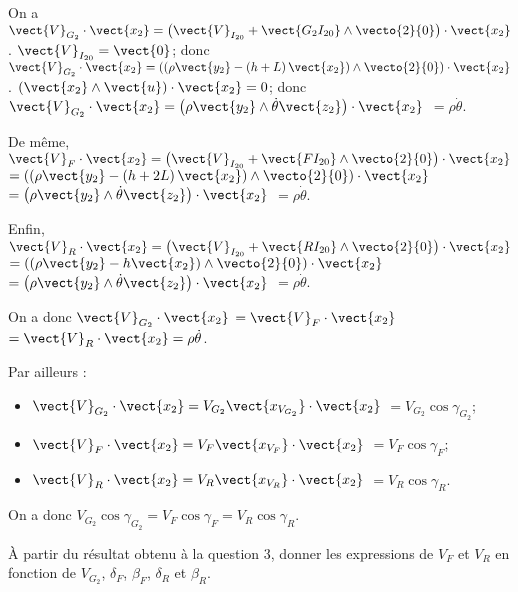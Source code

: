 \documentclass[11pt]{article}
\begin{document}
\begin{UPSTIcorrige}

On a $\vect{V}_{G_2} \cdot \vect{x_2}=\left(\vect{V}_{I_{20}}+\vect{G_2 I_{20}}\wedge \vecto{2}{0}\right)  \cdot \vect{x_2}$. $\vect{V}_{I_{20}}=\vect{0}$; donc $\vect{V}_{G_2} \cdot \vect{x_2}=\left(\left(\rho \vect{y_2} - \left(h+L\right)\vect{x_2}\right) \wedge \vecto{2}{0}\right)  \cdot \vect{x_2}$ .  $\left(\vect{x_2}\wedge \vect{u}\right)\cdot \vect{x_2} = 0$; donc 
$\vect{V}_{G_2} \cdot \vect{x_2}=\left(\rho \vect{y_2}  \wedge  \dot{\theta} \vect{z_2}\right)  \cdot \vect{x_2}$
$=\rho \dot{\theta} $.

De même,  $\vect{V}_{F} \cdot \vect{x_2} =\left(\vect{V}_{I_{20}}+\vect{F I_{20}}\wedge \vecto{2}{0}\right) \cdot \vect{x_2}$
$=\left(\left(\rho \vect{y_2} - \left(h+2L\right)\vect{x_2}\right)\wedge \vecto{2}{0}\right) \cdot \vect{x_2}$
$=\left(\rho \vect{y_2} \wedge  \dot{\theta} \vect{z_2}\right) \cdot \vect{x_2}$
$=\rho \dot{\theta} $.

Enfin, $\vect{V}_{R}\cdot \vect{x_2}=\left(\vect{V}_{I_{20}}+\vect{R I_{20}}\wedge \vecto{2}{0}\right) \cdot \vect{x_2}$
$=\left( \left(\rho \vect{y_2} - h\vect{x_2}\right)\wedge \vecto{2}{0}\right) \cdot \vect{x_2}$
$=\left(\rho \vect{y_2} \wedge \dot{\theta} \vect{z_2}\right) \cdot \vect{x_2}$
$=\rho \dot{\theta} $.


On a donc $\vect{V}_{G_2}\cdot\vect{x_2}$ $=\vect{V}_{F}\cdot\vect{x_2}$$=\vect{V}_{R}\cdot\vect{x_2} = \rho\dot{\theta}$.



Par ailleurs : 
\begin{itemize}
\item $\vect{V}_{G_2}\cdot\vect{x_2} = V_{G_2} \vect{x_{V_{G_2}}} \cdot\vect{x_2}$ $=V_{G_2} \cos \gamma_{G_2}$;
\item $\vect{V}_{F}\cdot\vect{x_2}={V}_{F}\vect{x_{V_F}}\cdot\vect{x_2}$  $=V_{F} \cos \gamma_{F}$;
\item $\vect{V}_{R}\cdot\vect{x_2}={V}_{R}\vect{x_{V_R}}\cdot\vect{x_2}$   $=V_{R} \cos \gamma_{R}$.
\end{itemize}

On a donc  $V_{G_2} \cos \gamma_{G_2}=V_{F} \cos \gamma_{F}=V_{R} \cos \gamma_{R}$.

\end{UPSTIcorrige}



\UPSTIquestion À partir du résultat obtenu à la question 3, donner les expressions de $V_F$ et $V_R$ en fonction de $V_{G_2}$, $\delta_F$, $\beta_F$, $\delta_R$ et $\beta_R$. 
\end{document}
